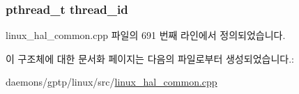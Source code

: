 \subsubsection[{\texorpdfstring{thread\+\_\+id}{thread_id}}]{\setlength{\rightskip}{0pt plus 5cm}pthread\+\_\+t thread\+\_\+id}\hypertarget{struct_linux_lock_private_a614409619094fd8c0c6b522c400ffeea}{}\label{struct_linux_lock_private_a614409619094fd8c0c6b522c400ffeea}


linux\+\_\+hal\+\_\+common.\+cpp 파일의 691 번째 라인에서 정의되었습니다.



이 구조체에 대한 문서화 페이지는 다음의 파일로부터 생성되었습니다.\+:\begin{DoxyCompactItemize}
\item 
daemons/gptp/linux/src/\hyperlink{linux__hal__common_8cpp}{linux\+\_\+hal\+\_\+common.\+cpp}\end{DoxyCompactItemize}
